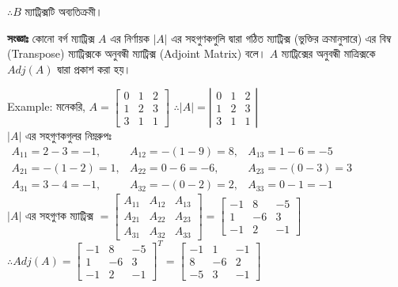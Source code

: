 $\therefore B$ ম্যাট্রিক্সটি অব্যতিক্রমী। 
\newpage
\begin{tcolorbox}[colback=green!5!white,colframe=green!75!black,title=\textbf{অনুবন্ধী ম্যাট্রিক্স (Adjoint Matrix)}]
	\textbf{সংজ্ঞাঃ} কোনো বর্গ ম্যাট্রিক্স $A$ এর নির্ণায়ক $|A|$ এর সহগুণকগুলি দ্বারা গঠিত ম্যাট্রিক্স (ভুক্তির ক্রমানুসারে)  এর বিম্ব (Transpose) ম্যাট্রিক্সকে অনুবন্ধী ম্যাট্রিক্স (Adjoint Matrix) বলে। $A$ ম্যাট্রিক্সের অনুবন্ধী মাত্রিক্সকে $Adj(A)$ দ্বারা প্রকাশ করা হয়।   
\end{tcolorbox}
Example: মনেকরি, 
$A=\left[\begin{array}{ccc}
0 & 1 & 2 \\
1 & 2 & 3 \\
3 & 1 & 1
\end{array}\right]$ 
$\therefore |A|=\left|\begin{array}{ccc}
0 & 1 & 2 \\
1 & 2 & 3 \\
3 & 1 & 1
\end{array}\right|$\\
$|A|$ এর সহগুণকগুলর নিম্নরুপঃ \\
$\begin{array}{ccc}
A_{11}=2-3=-1, & A_{12}=-(1-9)=8, & A_{13}=1-6=-5 \\
A_{21}=-(1-2)=1, & A_{22}=0-6=-6, & A_{23}=-(0-3)=3 \\
A_{31}=3-4=-1, & A_{32}=-(0-2)=2, & A_{33}=0-1=-1
\end{array}$\\
$|A|$ এর সহগুণক ম্যাট্রিক্স $=\left[\begin{array}{ccc}
A_{11} & A_{12} & A_{13} \\
A_{21} & A_{22} & A_{23} \\
A_{31} & A_{32} & A_{33} 
\end{array}\right]=\left[\begin{array}{rrr}
-1 & 8 & -5 \\
1 & -6 & 3 \\
-1 & 2 & -1
\end{array}\right]$\\
$\therefore Adj(A)=\left[\begin{array}{rrr}
-1 & 8 & -5 \\
1 & -6 & 3 \\
-1 & 2 & -1
\end{array}\right]^T=\left[\begin{array}{rrr}
-1 & 1 & -1 \\
8 & -6 & 2 \\
-5 & 3 & -1
\end{array}\right]$
